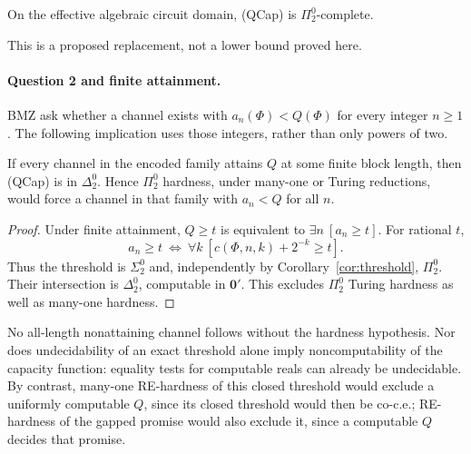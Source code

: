 \begin{conjecture}\label{conj:qcap}
On the effective algebraic circuit domain, (QCap) is $\Pi^0_2$-complete.
\end{conjecture}
This is a proposed replacement, not a lower bound proved here.

\paragraph{Question 2 and finite attainment.}
BMZ ask whether a channel exists with $a_n(\Phi)<Q(\Phi)$ for every
integer $n\geq1$. The following implication uses those integers, rather
than only powers of two.
\begin{proposition}\label{prop:attainment}
If every channel in the encoded family attains $Q$ at some finite block
length, then (QCap) is in $\Delta^0_2$. Hence $\Pi^0_2$ hardness, under
many-one or Turing reductions, would force a channel in that family
with $a_n<Q$ for all $n$.
\end{proposition}
\begin{proof}
Under finite attainment, $Q\geq t$ is equivalent to
$\exists n\ [a_n\geq t]$. For rational $t$,
\[
 a_n\geq t\ \Longleftrightarrow\
 \forall k\ [c(\Phi,n,k)+2^{-k}\geq t].
\]
Thus the threshold is $\Sigma^0_2$ and, independently by
Corollary~\ref{cor:threshold}, $\Pi^0_2$. Their intersection is
$\Delta^0_2$, computable in $\mathbf0'$. This excludes $\Pi^0_2$
Turing hardness as well as many-one hardness.
\end{proof}
No all-length nonattaining channel follows without the hardness
hypothesis. Nor does undecidability of an exact threshold alone imply
noncomputability of the capacity function: equality tests for computable
reals can already be undecidable. By contrast, many-one RE-hardness of
this closed threshold would exclude a uniformly computable $Q$, since
its closed threshold would then be co-c.e.; RE-hardness of the gapped
promise would also exclude it, since a computable $Q$ decides that promise.
